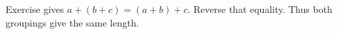 Exercise  gives $a+(b+c)=(a+b)+c$. Reverse that equality. Thus both groupings give the same length.
